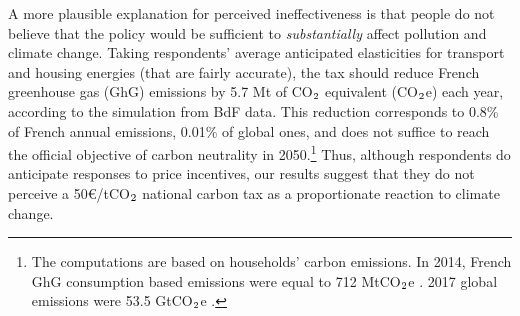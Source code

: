 \documentclass[12pt]{article} %
\begin{document}

A more plausible explanation for perceived ineffectiveness is that people do not believe that the policy would be sufficient to \textit{substantially} affect pollution and climate change. Taking respondents' average anticipated elasticities for transport and housing energies (that are fairly accurate), the tax should reduce French greenhouse gas (GhG) emissions by 5.7 Mt of CO$_\textnormal{2}$ equivalent (CO$_\textnormal{2}$e) each year, according to the simulation from BdF data. This reduction corresponds to 0.8\% of French annual emissions, 0.01\% of global ones, and does not suffice to reach the official objective of carbon neutrality in 2050.\footnote{The computations are based on households' carbon emissions. In 2014, French GhG consumption based emissions were equal to 712 MtCO$_\textnormal{2}$e \citep{cgdd_chiffres_2019}. 2017 global emissions were 53.5 GtCO$_\textnormal{2}$e \citep{unep_emissions_2018}.} Thus, although respondents do anticipate responses to price incentives, our results suggest that they do not perceive a 50\euro/tCO$_\textnormal{2}$ national carbon tax as a proportionate reaction to climate change. 

\end{document}
